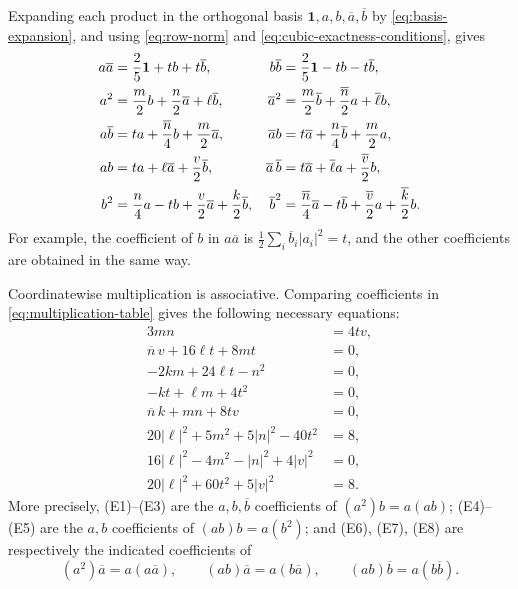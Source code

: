 \documentclass[11pt,reqno]{amsart}
\theoremstyle{remark}
\newcommand{\one}{\mathbf 1}
\newcommand{\abs}[1]{\left\lvert #1\right\rvert}
\begin{document}
Expanding each product in the orthogonal basis
$\one,a,b,\overline a,\overline b$ by \eqref{eq:basis-expansion}, and using
\eqref{eq:row-norm} and \eqref{eq:cubic-exactness-conditions}, gives
\begin{align}
a\overline a&=\frac25\one+tb+t\overline b,
&b\overline b&=\frac25\one-tb-t\overline b,\notag\\
a^2&=\frac m2b+\frac n2\overline a+\ell\overline b,
&\overline a^2&=\frac m2\overline b+\frac{\overline n}{2}a+\overline\ell b,
\notag\\
a\overline b&=ta+\frac{\overline n}{4}b+\frac m2\overline a,
&\overline a b&=t\overline a+\frac n4\overline b+\frac m2a,
\notag\\
ab&=ta+\ell\overline a+\frac v2\overline b,
&\overline a\,\overline b&=t\overline a+\overline\ell a
 +\frac{\overline v}{2}b,
\notag\\
b^2&=\frac n4a-tb+\frac v2\overline a+\frac k2\overline b,
&\overline b^2&=\frac{\overline n}{4}\overline a-t\overline b
 +\frac{\overline v}{2}a+\frac{\overline k}{2}b.
\label{eq:multiplication-table}
\end{align}
For example, the coefficient of $b$ in $a\overline a$ is
$\frac12\sum_i\overline b_i\abs{a_i}^2=t$, and the other coefficients are
obtained in the same way.

Coordinatewise multiplication is associative.  Comparing coefficients in
\eqref{eq:multiplication-table} gives the following necessary equations:
\begin{align}
3mn&=4tv,\tag{E1}\label{eq:E1}\\
\overline n\,v+16\ell t+8mt&=0,\tag{E2}\label{eq:E2}\\
-2km+24\ell t-n^2&=0,\tag{E3}\label{eq:E3}\\
-kt+\ell m+4t^2&=0,\tag{E4}\label{eq:E4}\\
\overline n\,k+mn+8tv&=0,\tag{E5}\label{eq:E5}\\
20\abs\ell^2+5m^2+5\abs n^2-40t^2&=8,\tag{E6}\label{eq:E6}\\
16\abs\ell^2-4m^2-\abs n^2+4\abs v^2&=0,\tag{E7}\label{eq:E7}\\
20\abs\ell^2+60t^2+5\abs v^2&=8.\tag{E8}\label{eq:E8}
\end{align}
More precisely, (E1)--(E3) are the $a,b,\overline b$ coefficients of
$(a^2)b=a(ab)$; (E4)--(E5) are the $a,b$ coefficients of
$(ab)b=a(b^2)$; and (E6), (E7), (E8) are respectively the indicated
coefficients of
\[
(a^2)\overline a=a(a\overline a),\qquad
(ab)\overline a=a(b\overline a),\qquad
(ab)\overline b=a(b\overline b).
\]
\end{document}
